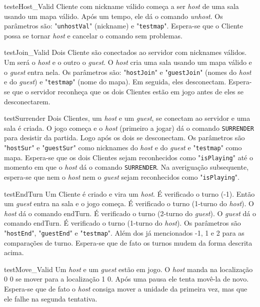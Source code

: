 \begin{itemise}
\teste
    {testeHost\_Valid}
    {Cliente com nickname válido começa a ser \emph{host} de uma sala usando um mapa
    válido. Após um tempo, ele dá o comando \emph{unhost}. Os parâmetros são:
    "\texttt{unhostVal}" (nickname) e "\texttt{testmap}".}
    {Espera-se que o Cliente possa se tornar \emph{host} e cancelar o comando sem
    problemas.}

\teste
    {testJoin\_Valid}
    {Dois Cliente são conectados ao servidor com nicknames válidos. Um será o
    \emph{host} e o outro o \emph{guest}. O \emph{host} cria uma sala usando um mapa
    válido e o \emph{guest} entra nela. Os parâmetros são: "\texttt{hostJoin}" e
    "\texttt{guestJoin}" (nomes do \emph{host} e do \emph{guest}) e
    "\texttt{testmap}" (nome do mapa). Em seguida, eles desconectam.}
    {Espera-se que o servidor reconheça que os dois Clientes estão em jogo antes de
    eles se desconectarem.}

\teste
    {testSurrender}
    {Dois Clientes, um \emph{host} e um \emph{guest}, se conectam ao servidor e uma
    sala é criada. O jogo começa e o \emph{host} (primeiro a jogar) dá o comando
    \texttt{SURRENDER} para desistir da partida. Logo após os dois se desconectam.
    Os parâmetros são "\texttt{hostSur}" e "\texttt{guestSur}" como nicknames do
    \emph{host} e do \emph{guest} e "\texttt{testmap}" como mapa.}
    {Espera-se que os dois Clientes sejam reconhecidos como "\texttt{isPlaying}"
    até o momento em que o \emph{host} dá o comando \texttt{SURRENDER}. Na
    averiguação subsequente, espera-se que nem o \emph{host} nem o \emph{guest}
    sejam reconhecidos como "\texttt{isPlaying}".}

\teste
    {testEndTurn}
    {Um Cliente é criado e vira um \emph{host}. É verificado o turno (-1). Então um
    \emph{guest} entra na sala e o jogo começa. É verificado o turno (1-turno do
    \emph{host}). O \emph{host} dá o comando endTurn. É verificado o turno (2-turno
    do \emph{guest}). O \emph{guest} dá o comando endTurn. É verificado o turno
    (1-turno do \emph{host}). Os parâmetros são "\texttt{hostEnd}",
    "\texttt{guestEnd}" e "\texttt{testmap}". Além dos já mencionados -1, 1 e 2 para
    as comparações de turno.}
    {Espera-se que de fato os turnos mudem da forma descrita acima.}

\teste
    {testMove\_Valid}
    {Um \emph{host} e um \emph{guest} estão em jogo. O \emph{host} manda na
    localização 0 0 se mover para a localização 1 0. Após uma pausa ele tenta
    movê-la de novo.}
    {Espera-se que de fato o \emph{host} consiga mover a unidade da primeira vez,
    mas que ele falhe na segunda tentativa.}


\end{itemise}
